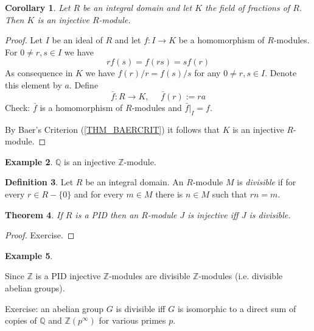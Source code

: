 \documentclass[12pt, letterpaper, oneside]{article}
\theoremstyle{plain}
\newtheorem{theorem}{Theorem}[section]
\newtheorem{corollary}[theorem]{Corollary}
\theoremstyle{definition}
\newtheorem{definition}[theorem]{Definition}
\newtheorem{example}[theorem]{Example}
\newcommand{\Z}{{\mathbb Z}}
\newcommand{\Q}{{\mathbb Q}}
\newcommand{\vs}{\vskip 5mm}
\begin{document}
\vs\vs

\begin{corollary}
Let $R$ be an integral domain and let $K$ the field of fractions of $R$. Then $K$ is 
an injective $R$-module.  
\end{corollary}

\vs

\begin{proof}
Let $I$ be an ideal of $R$ and let $f\colon I \to K$ be a homomorphism of $R$-modules. 
For $0\neq r, s\in I$ we have 
$$rf(s) = f(rs) = sf(r)$$
As  consequence in $K$ we have $f(r)/r = f(s)/s$
for any $0\neq r, s\in I$. Denote this element by $a$. Define 
$$\bar{f} \colon R \to K, \ \ \ \ \ \ \bar{f}(r) := ra$$
Check: $\bar{f}$ is a homomorphism of $R$-modules and $\bar{f}|_{I} = f$.

By Baer's Criterion (\ref{THM_BAERCRIT}) it follows that $K$ is an injective $R$-module. 
\end{proof}


\vs\vs

\begin{example} 

$\Q$ is an injective $\Z$-module. 

\end{example}



\vs\vs

\begin{definition}
Let $R$ be an integral domain. An $R$-module $M$ is \emph{divisible} if for every 
$r\in R-\{0\}$ and for every $m\in M$ there is $n\in M$ such that $rn=m$.
\end{definition}


\vs\vs

\begin{theorem}
If $R$ is a PID then an $R$-module $J$ is injective iff $J$ is divisible.  
\end{theorem}

\vs 

\begin{proof}
Exercise. 
\end{proof}


\vs\vs

\begin{example} \ 

Since $\Z$ is a PID injective $\Z$-modules are divisible $\Z$-modules 
(i.e. divisible abelian groups).

Exercise: an abelian group $G$ is divisible iff $G$ is isomorphic to a direct sum 
of copies of $\Q$ and $\Z(p^{\infty})$ for various primes $p$.
\end{example}
\end{document}
